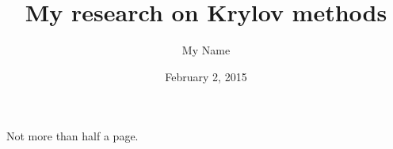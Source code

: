 \documentclass{article}
\title{My research on Krylov methods}
\author{My Name}
\affil{PhD student at XX}
\date{February 2, 2015}
\begin{document}
\maketitle

Not more than half a page.
\end{document}
